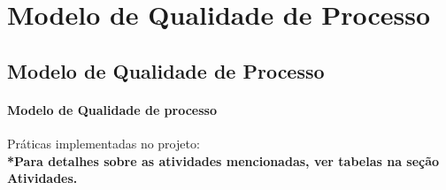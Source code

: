 \part{Modelo de Qualidade de Processo} 
\chapter[Modelo de Qualidade de Processo]{Modelo de Qualidade de Processo}
{\large {\subsection { Modelo de Qualidade de processo \\ } } }
{\large Práticas implementadas no projeto:\\}
{\footnotesize {\textbf { *Para detalhes sobre as atividades mencionadas, ver tabelas na seção Atividades. \\ }}}

